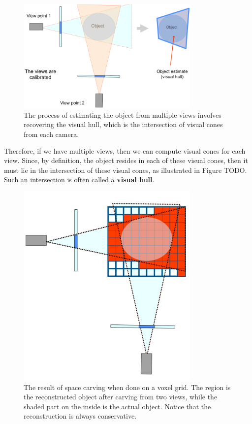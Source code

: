 \documentclass[a4paper, 12pt]{article}
\renewcommand\emph{\textbf}
\numberwithin{equation}{section}
\begin{document}
\begin{figure}[h!]
    \centering
    \includegraphics[width = 0.8\textwidth]{figures/visual_hull.png}
    \caption{The process of estimating the object from multiple views involves recovering the visual hull, which is the intersection of visual cones from each camera.}
    \label{fig:visual_hull}
\end{figure}

Therefore, if we have multiple views, then we can compute visual cones for each view. Since, by definition, the object resides in each of these visual cones, then it must lie in the intersection of these visual cones, as illustrated in Figure TODO. Such an intersection is often called a \emph{visual hull}. 

\begin{figure}[h!]
    \centering
    \includegraphics[width = 0.8\textwidth]{figures/space_carving.png}
    \caption{The result of space carving when done on a voxel grid. The region is the reconstructed object after carving from two views, while the shaded part on the inside is the actual object. Notice that the reconstruction is always conservative.}
    \label{fig:space_carving}
\end{figure}
\end{document}
